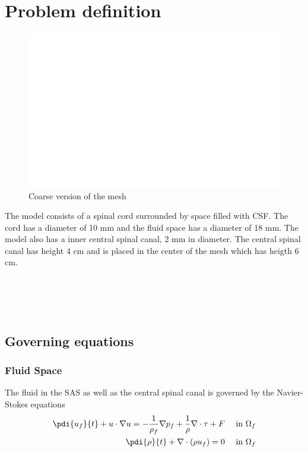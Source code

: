 \chapter{Problem definition}
\begin{figure}
	\vspace{-60pt}
	\begin{center}
		\includegraphics[scale=0.2]{mesh}
	\end{center}
	\vspace{-20pt}
	\caption{Coarse version of the mesh}
	\vspace{-10pt}
\end{figure}
The model consists of a spinal cord surrounded by space filled with CSF. The cord has a diameter of 10 mm and the fluid space has a diameter of 18 mm. The model also has a inner central spinal canal, 2 mm in diameter. The central spinal canal has height 4 cm and is placed in the center of the mesh which has heigth 6 cm.
\\
\\
\\
\\
\\



\section{Governing equations}



\subsection{Fluid Space}
The fluid in the SAS as well as the central spinal canal is governed by the Navier-Stokes equations
\begin{align}
	\pdi{u_f}{t} + u\cdot \nabla u = -\frac{1}{\rho_f}\nabla p_f + \frac{1}{\rho} \nabla \cdot 		\tau + F&& \text{ in } \Omega_f \label{N-S_m1}
	\\
	\pdi{\rho}{t} +\nabla \cdot(\rho u_f) = 0 && \text{ in } \Omega_f \label{N-S_c1}
\end{align}

